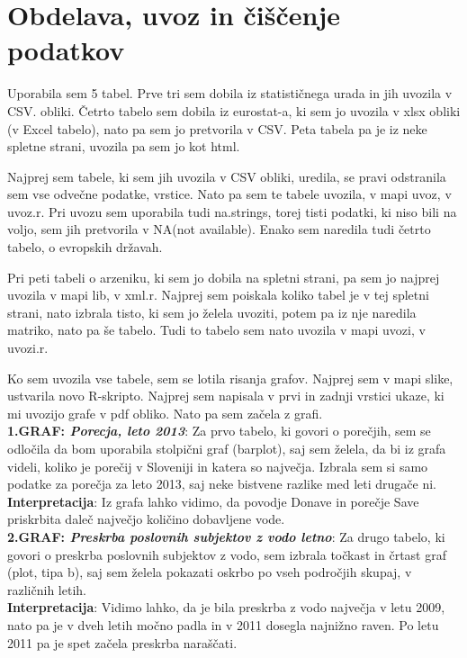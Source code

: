 \documentclass[11pt,a4paper]{article}
\begin{document}
\newpage
\section{Obdelava, uvoz in čiščenje podatkov}

Uporabila sem 5 tabel.
Prve tri sem dobila iz statističnega urada in jih uvozila v CSV. obliki.
Četrto tabelo sem dobila iz eurostat-a, ki sem jo uvozila v xlsx obliki (v Excel tabelo), nato pa sem jo pretvorila v CSV. Peta tabela pa je iz neke spletne strani, uvozila pa sem jo kot html.

Najprej sem tabele, ki sem jih uvozila v CSV obliki, uredila, se pravi odstranila sem vse odvečne podatke, vrstice. Nato pa sem te tabele uvozila, v mapi uvoz, v uvoz.r. Pri uvozu sem uporabila tudi na.strings, torej tisti podatki, ki niso bili na voljo, sem jih pretvorila v NA(not available). Enako sem naredila tudi četrto tabelo, o evropskih državah.

Pri peti tabeli o arzeniku, ki sem jo dobila na spletni strani, pa sem jo najprej uvozila v mapi lib, v xml.r. Najprej sem poiskala koliko tabel je v tej spletni strani, nato izbrala tisto, ki sem jo želela uvoziti, potem pa iz nje naredila matriko, nato pa še tabelo. Tudi to tabelo sem nato uvozila v mapi uvozi, v uvozi.r.

Ko sem uvozila vse tabele, sem se lotila risanja grafov. Najprej sem v mapi slike, ustvarila novo R-skripto. Najprej sem napisala v prvi in zadnji vrstici ukaze, ki mi uvozijo grafe v pdf obliko. Nato pa sem začela z grafi.\\


\textbf{1.GRAF: \emph{Porecja, leto 2013}}: Za prvo tabelo, ki govori o porečjih, sem se odločila da bom uporabila stolpični graf (barplot), saj sem želela, da bi iz grafa videli, koliko je porečij v Sloveniji in katera so največja. Izbrala sem si samo podatke za porečja za leto 2013, saj neke bistvene razlike med leti drugače ni.\\
\textbf{Interpretacija}: Iz grafa lahko vidimo, da povodje Donave in porečje Save priskrbita daleč največjo količino dobavljene vode.\\

\textbf{2.GRAF: \emph{Preskrba poslovnih subjektov z vodo letno}}: Za drugo tabelo, ki govori o preskrba poslovnih subjektov z vodo, sem izbrala točkast in črtast graf (plot, tipa b), saj sem želela pokazati oskrbo po vseh področjih skupaj, v različnih letih.\\
\textbf{Interpretacija}: Vidimo lahko, da je bila preskrba z vodo največja v letu 2009, nato pa je v dveh letih močno padla in v 2011 dosegla najnižno raven. Po letu 2011 pa je spet začela preskrba naraščati.\\
\end{document}

